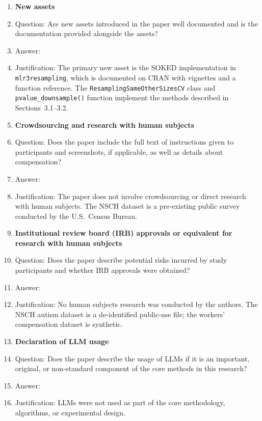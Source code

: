 \begin{enumerate}
\item {\bf New assets}
    \item[] Question: Are new assets introduced in the paper well documented and is the documentation provided alongside the assets?
    \item[] Answer: \answerYes{}
    \item[] Justification: The primary new asset is the SOKED implementation in \texttt{mlr3resampling}, which is documented on CRAN with vignettes and a function reference. The \texttt{ResamplingSameOtherSizesCV} class and \texttt{pvalue\_downsample()} function implement the methods described in Sections~3.1--3.2.

\item {\bf Crowdsourcing and research with human subjects}
    \item[] Question: Does the paper include the full text of instructions given to participants and screenshots, if applicable, as well as details about compensation?
    \item[] Answer: \answerNA{}
    \item[] Justification: The paper does not involve crowdsourcing or direct research with human subjects. The NSCH dataset is a pre-existing public survey conducted by the U.S.\ Census Bureau.

\item {\bf Institutional review board (IRB) approvals or equivalent for research with human subjects}
    \item[] Question: Does the paper describe potential risks incurred by study participants and whether IRB approvals were obtained?
    \item[] Answer: \answerNA{}
    \item[] Justification: No human subjects research was conducted by the authors. The NSCH autism dataset is a de-identified public-use file; the workers' compensation dataset is synthetic.

\item {\bf Declaration of LLM usage}
    \item[] Question: Does the paper describe the usage of LLMs if it is an important, original, or non-standard component of the core methods in this research?
    \item[] Answer: \answerNA{}
    \item[] Justification: LLMs were not used as part of the core methodology, algorithms, or experimental design.

\end{enumerate}
